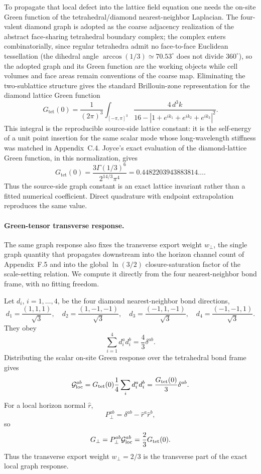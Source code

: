 \documentclass[11pt]{article}
\begin{document}
To propagate that local defect into the lattice field equation one needs the on-site Green function of the tetrahedral/diamond nearest-neighbor Laplacian. The four-valent diamond graph is adopted as the coarse adjacency realization of the abstract face-sharing tetrahedral boundary complex; the complex enters combinatorially, since regular tetrahedra admit no face-to-face Euclidean tessellation (the dihedral angle $\arccos(1/3)\simeq70.53^\circ$ does not divide $360^\circ$), so the adopted graph and its Green function are the working objects while cell volumes and face areas remain conventions of the coarse map. Eliminating the two-sublattice structure gives the standard Brillouin-zone representation for the diamond lattice Green function \citep{Guttmann2010}
\[
G_{\mathrm{tet}}(0)
=
\frac{1}{(2\pi)^3}
\int_{[-\pi,\pi]^3}
\frac{4\,d^3k}
{16-\left|1+e^{ik_1}+e^{ik_2}+e^{ik_3}\right|^2}.
\]
This integral is the reproducible source-side lattice constant: it is the self-energy of a unit point insertion for the same scalar mode whose long-wavelength stiffness was matched in Appendix~C.4. Joyce's exact evaluation of the diamond-lattice Green function, in this normalization, gives \citep{Joyce1994,Guttmann2010}
\[
G_{\mathrm{tet}}(0)
=
\frac{3\Gamma(1/3)^6}{2^{14/3}\pi^4}
=
0.4482203943883814\ldots .
\]
Thus the source-side graph constant is an exact lattice invariant rather than a fitted numerical coefficient. Direct quadrature with endpoint extrapolation reproduces the same value.

\paragraph{Green-tensor transverse response.}
The same graph response also fixes the transverse export weight $w_\perp$, the single graph quantity that propagates downstream into the horizon channel count of Appendix~F.5 and into the global $\ln(3/2)$ closure-saturation factor of the scale-setting relation. We compute it directly from the four nearest-neighbor bond frame, with no fitting freedom.

Let $d_i$, $i=1,\ldots,4$, be the four diamond nearest-neighbor bond directions,
\[
d_1=\frac{(1,1,1)}{\sqrt3},\quad
d_2=\frac{(1,-1,-1)}{\sqrt3},\quad
d_3=\frac{(-1,1,-1)}{\sqrt3},\quad
d_4=\frac{(-1,-1,1)}{\sqrt3}.
\]
They obey
\[
\sum_{i=1}^4 d_i^a d_i^b=\frac43\delta^{ab}.
\]
Distributing the scalar on-site Green response over the tetrahedral bond frame gives
\[
{\cal G}_{\rm loc}^{ab}
=
G_{\mathrm{tet}}(0)\frac14\sum_i d_i^a d_i^b
=
\frac{G_{\mathrm{tet}}(0)}{3}\delta^{ab}.
\]
For a local horizon normal $\hat r$,
\[
P_\perp^{ab}=\delta^{ab}-\hat r^a\hat r^b,
\]
so
\[
G_\perp=P_\perp^{ab}{\cal G}_{\rm loc}^{ab}
=
\frac23G_{\mathrm{tet}}(0).
\]
Thus the transverse export weight $w_\perp=2/3$ is the transverse part of the exact local graph response.
\end{document}

